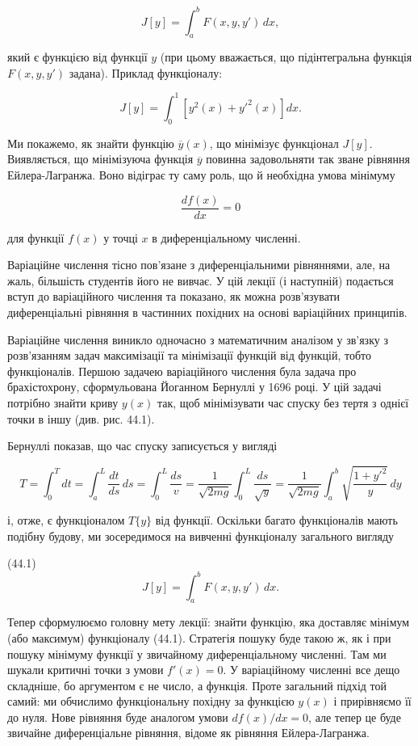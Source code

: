 \documentclass[
  ukrainian,
]{article}
\begin{document}
\[
J[y] = \int_a^b F(x, y, y')\,dx,
\]

який є функцією від функції \(y\) (при цьому вважається, що
підінтегральна функція \(F(x, y, y')\) задана). Приклад функціоналу:

\[
J[y] = \int_0^1 \left[y^2(x) + y'^2(x)\right] dx.
\]

Ми покажемо, як знайти функцію \(\overline{y}(x)\), що мінімізує
функціонал \(J[y]\). Виявляється, що мінімізуюча функція
\(\overline{y}\) повинна задовольняти так зване рівняння
Ейлера-Лагранжа. Воно відіграє ту саму роль, що й необхідна умова
мінімуму

\[
\frac{df(x)}{dx} = 0
\]

для функції \(f(x)\) у точці \(x\) в диференціальному численні.

Варіаційне числення тісно пов'язане з диференціальними рівняннями, але,
на жаль, більшість студентів його не вивчає. У цій лекції (і наступній)
подається вступ до варіаційного числення та показано, як можна
розв'язувати диференціальні рівняння в частинних похідних на основі
варіаційних принципів.

Варіаційне числення виникло одночасно з математичним аналізом у зв'язку
з розв'язанням задач максимізації та мінімізації функцій від функцій,
тобто функціоналів. Першою задачею варіаційного числення була задача про
брахістохрону, сформульована Йоганном Бернуллі у 1696 році. У цій задачі
потрібно знайти криву \(y(x)\) так, щоб мінімізувати час спуску без
тертя з однієї точки в іншу (див. рис. 44.1).

Бернуллі показав, що час спуску записується у вигляді

\[
T = \int_0^T dt = \int_a^L \frac{dt}{ds}\,ds = \int_0^L \frac{ds}{v}
= \frac{1}{\sqrt{2mg}} \int_0^L \frac{ds}{\sqrt{y}}
= \frac{1}{\sqrt{2mg}} \int_a^b \sqrt{\frac{1+y'^2}{y}}\,dy
\]

і, отже, є функціоналом \(T\{y\}\) від функції. Оскільки багато
функціоналів мають подібну будову, ми зосередимося на вивченні
функціоналу загального вигляду

(44.1) \[
J[y] = \int_a^b F(x, y, y')\,dx.
\]

Тепер сформулюємо головну мету лекції: знайти функцію, яка доставляє
мінімум (або максимум) функціоналу (44.1). Стратегія пошуку буде такою
ж, як і при пошуку мінімуму функції у звичайному диференціальному
численні. Там ми шукали критичні точки з умови \(f'(x)=0\). У
варіаційному численні все дещо складніше, бо аргументом є не число, а
функція. Проте загальний підхід той самий: ми обчислимо функціональну
похідну за функцією \(y(x)\) і прирівняємо її до нуля. Нове рівняння
буде аналогом умови \(df(x)/dx = 0\), але тепер це буде звичайне
диференціальне рівняння, відоме як рівняння Ейлера-Лагранжа.
\end{document}
